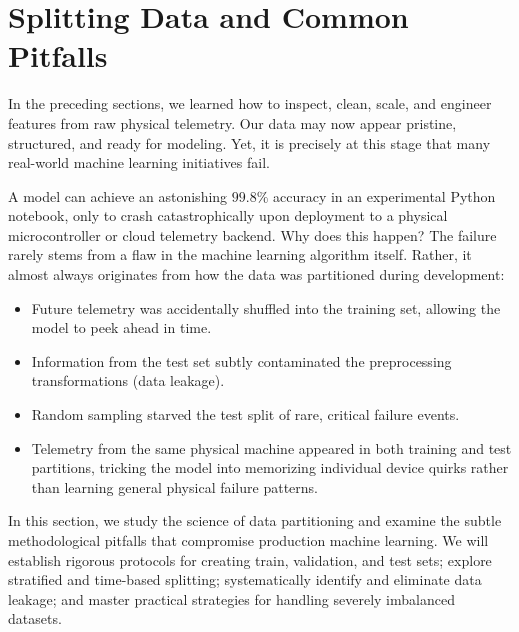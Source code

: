 \section{Splitting Data and Common Pitfalls}\label{sec:splitting_pitfalls}

In the preceding sections, we learned how to inspect, clean, scale, and engineer features from raw physical telemetry. Our data may now appear pristine, structured, and ready for modeling. Yet, it is precisely at this stage that many real-world machine learning initiatives fail. 

A model can achieve an astonishing $99.8\%$ accuracy in an experimental Python notebook, only to crash catastrophically upon deployment to a physical microcontroller or cloud telemetry backend. Why does this happen? The failure rarely stems from a flaw in the machine learning algorithm itself. Rather, it almost always originates from how the data was partitioned during development:
\begin{itemize}
    \item Future telemetry was accidentally shuffled into the training set, allowing the model to peek ahead in time.
    \item Information from the test set subtly contaminated the preprocessing transformations (data leakage).
    \item Random sampling starved the test split of rare, critical failure events.
    \item Telemetry from the same physical machine appeared in both training and test partitions, tricking the model into memorizing individual device quirks rather than learning general physical failure patterns.
\end{itemize}

In this section, we study the science of data partitioning and examine the subtle methodological pitfalls that compromise production machine learning. We will establish rigorous protocols for creating train, validation, and test sets; explore stratified and time-based splitting; systematically identify and eliminate data leakage; and master practical strategies for handling severely imbalanced datasets.

